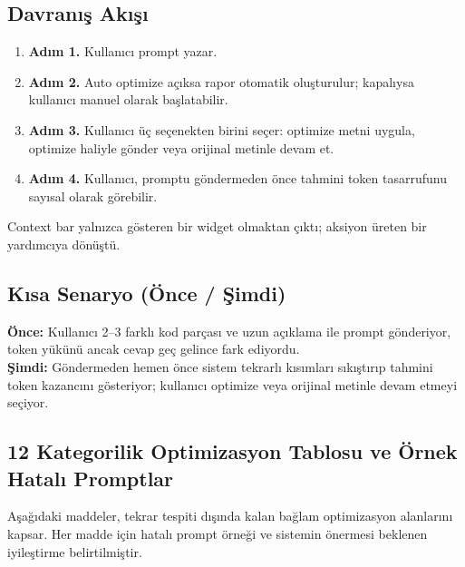 \documentclass[11pt,a4paper]{article}
\begin{document}
\subsection{Davranış Akışı}

\begin{enumerate}[leftmargin=1.5em]
  \item \textbf{Adım 1.} Kullanıcı prompt yazar.
  \item \textbf{Adım 2.} Auto optimize açıksa rapor otomatik oluşturulur; kapalıysa kullanıcı manuel olarak başlatabilir.
  \item \textbf{Adım 3.} Kullanıcı üç seçenekten birini seçer: optimize metni uygula, optimize haliyle gönder veya orijinal metinle devam et.
  \item \textbf{Adım 4.} Kullanıcı, promptu göndermeden önce tahmini token tasarrufunu sayısal olarak görebilir.
\end{enumerate}

\begin{notebox}
Context bar yalnızca gösteren bir widget olmaktan çıktı; aksiyon üreten bir yardımcıya dönüştü.
\end{notebox}

\subsection{Kısa Senaryo (Önce / Şimdi)}

\begin{notebox}
\textbf{Önce:} Kullanıcı 2--3 farklı kod parçası ve uzun açıklama ile prompt gönderiyor, token yükünü ancak cevap geç gelince fark ediyordu.\\[4pt]
\textbf{Şimdi:} Göndermeden hemen önce sistem tekrarlı kısımları sıkıştırıp tahmini token kazancını gösteriyor; kullanıcı optimize veya orijinal metinle devam etmeyi seçiyor.
\end{notebox}

\subsection{12 Kategorilik Optimizasyon Tablosu ve Örnek Hatalı Promptlar}

Aşağıdaki maddeler, tekrar tespiti dışında kalan bağlam optimizasyon alanlarını kapsar. Her madde için hatalı prompt örneği ve sistemin önermesi beklenen iyileştirme belirtilmiştir.
\end{document}
